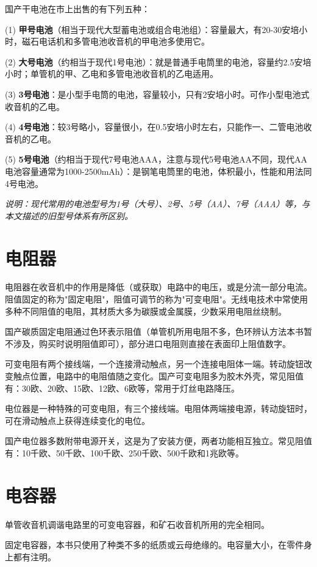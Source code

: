 \documentclass[12pt,UTF8]{ctexbook}
\begin{document}
国产干电池在市上出售的有下列五种：

(1) \textbf{甲号电池}（相当于现代大型蓄电池或组合电池组）：容量最大，有20-30安培小时，磁石电话机和多管电池收音机的甲电池多使用它。

(2) \textbf{大号电池}（约相当于现代1号电池）：就是普通手电筒里的电池，容量约2.5安培小时；单管机的甲、乙电和多管电池收音机的乙电适用。

(3) \textbf{3号电池}：是小型手电筒的电池，容量较小，只有2安培小时。可作小型电池式收音机的乙电。

(4) \textbf{4号电池}：较3号略小，容量很小，在0.5安培小时左右，只能作一、二管电池收音机的乙电。

(5) \textbf{5号电池}（约相当于现代7号电池AAA，注意与现代5号电池AA不同，现代AA电池容量通常为1000-2500mAh）：是钢笔电筒里的电池，体积最小，性能和用法同4号电池。

\textit{说明：现代常用的电池型号为1号（大号）、2号、5号（AA）、7号（AAA）等，与本文描述的旧型号体系有所区别。}

\section{电阻器}

电阻器在收音机中的作用是降低（或获取）电路中的电压，或是分流一部分电流。阻值固定的称为"固定电阻"，阻值可调节的称为"可变电阻"。无线电技术中常使用多种不同阻值的电阻，其材质大多为碳膜或金属膜，少数采用电阻丝绕制。

国产碳质固定电阻通过色环表示阻值（单管机所用电阻不多，色环辨认方法本书暂不涉及，购买时说明阻值即可），部分进口电阻则直接在表面印上阻值数字。

可变电阻有两个接线端，一个连接滑动触点，另一个连接电阻体一端。转动旋钮改变触点位置，电路中的电阻值随之变化。国产可变电阻多为胶木外壳，常见阻值有：30欧、20欧、15欧、12欧、6欧等，常用于灯丝电路降压。

电位器是一种特殊的可变电阻，有三个接线端。电阻体两端接电源，转动旋钮时，可在滑动触点上获得连续变化的电位。

国产电位器多数附带电源开关，这是为了安装方便，两者功能相互独立。常见阻值有：10千欧、50千欧、100千欧、250千欧、500千欧和1兆欧等。

\section{电容器}

单管收音机调谐电路里的可变电容器，和矿石收音机所用的完全相同。

固定电容器，本书只使用了种类不多的纸质或云母绝缘的。电容量大小，在零件身上都有注明。
\end{document}
